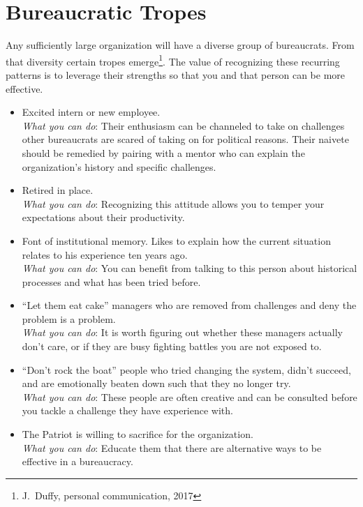 \section{Bureaucratic Tropes\label{sec:tropes}}

Any sufficiently large organization will have a diverse group of bureaucrats. From that diversity certain tropes emerge\footnote{J.~Duffy, personal communication, 2017}. The value of recognizing these recurring patterns is to leverage their strengths so that you and that person can be more effective. 


\begin{itemize}
    \item Excited intern or new employee. \\
    \textit{What you can do}: Their enthusiasm can be channeled to take on challenges other bureaucrats are scared of taking on for political reasons. Their naivete should be remedied by pairing with a mentor who can explain the organization's history and specific challenges.
    
    \item Retired in place. \\
    \textit{What you can do}: Recognizing this attitude allows you to temper your expectations about their productivity. 
    
    \item Font of institutional memory. Likes to explain how the current situation relates to his experience ten years ago. \\
    \textit{What you can do}: You can benefit from talking to this person about historical processes and what has been tried before. 
    
    \item ``Let them eat cake'' managers who are removed from challenges and deny the problem is a problem. \\
    \textit{What you can do}: It is worth figuring out whether these managers actually don't care, or if they are busy fighting battles you are not exposed to.
    
    \item ``Don't rock the boat'' people who tried changing the system, didn't succeed, and are emotionally beaten down such that they no longer try. \\
    \textit{What you can do}: These people are often creative and can be consulted before you tackle a challenge they have experience with. 
    
    \item The Patriot is willing to sacrifice for the organization. \\
    \textit{What you can do}: Educate them that there are alternative ways to be effective in a bureaucracy.
    

\end{itemize}
